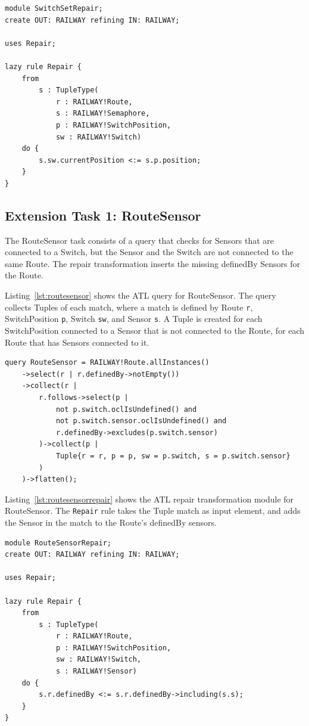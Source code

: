 \documentclass[submission,copyright,creativecommons]{eptcs}
\begin{document}
\lstset{language=atl}
\begin{lstlisting}[float=htb, caption={SwitchSet repair transformation module in ATL}, label=lst:switchsetrepair, captionpos=b, frame=tb, belowskip=-10pt]
module SwitchSetRepair;
create OUT: RAILWAY refining IN: RAILWAY;

uses Repair;

lazy rule Repair {
	from
		s : TupleType(
			r : RAILWAY!Route, 
			s : RAILWAY!Semaphore, 
			p : RAILWAY!SwitchPosition, 
			sw : RAILWAY!Switch)
	do {
		s.sw.currentPosition <:= s.p.position;
	}
}
\end{lstlisting}

\subsection{Extension Task 1: RouteSensor}

The RouteSensor task consists of a query that checks for Sensors that are connected to a Switch, but the Sensor and the Switch are not connected to the same Route. The repair transformation inserts the missing definedBy Sensors for the Route. 

Listing~\ref{lst:routesensor} shows the ATL query for RouteSensor. The query collects Tuples of each match, where a match is defined by Route \texttt{r}, SwitchPosition \texttt{p}, Switch \texttt{sw}, and Sensor \texttt{s}. A Tuple is created for each SwitchPosition connected to a Sensor that is not connected to the Route, for each Route that has Sensors connected to it. 

\lstset{language=atl}
\begin{lstlisting}[float=htb, caption={RouteSensor query in ATL}, label=lst:routesensor, captionpos=b, frame=tb, belowskip=-10pt]
query RouteSensor = RAILWAY!Route.allInstances()
	->select(r | r.definedBy->notEmpty())
	->collect(r |
		r.follows->select(p | 
			not p.switch.oclIsUndefined() and 
			not p.switch.sensor.oclIsUndefined() and
			r.definedBy->excludes(p.switch.sensor)
		)->collect(p | 
			Tuple{r = r, p = p, sw = p.switch, s = p.switch.sensor}
		)
	)->flatten();
\end{lstlisting}

Listing~\ref{lst:routesensorrepair} shows the ATL repair transformation module for RouteSensor. The \texttt{Repair} rule takes the Tuple match as input element, and adds the Sensor in the match to the Route's definedBy sensors.

\lstset{language=atl}
\begin{lstlisting}[float=htb, caption={RouteSensor repair transformation module in ATL}, label=lst:routesensorrepair, captionpos=b, frame=tb, belowskip=-10pt]
module RouteSensorRepair;
create OUT: RAILWAY refining IN: RAILWAY;

uses Repair;

lazy rule Repair {
	from
		s : TupleType(
			r : RAILWAY!Route, 
			p : RAILWAY!SwitchPosition, 
			sw : RAILWAY!Switch,
			s : RAILWAY!Sensor)
	do {
		s.r.definedBy <:= s.r.definedBy->including(s.s);
	}
}
\end{lstlisting}
\end{document}
